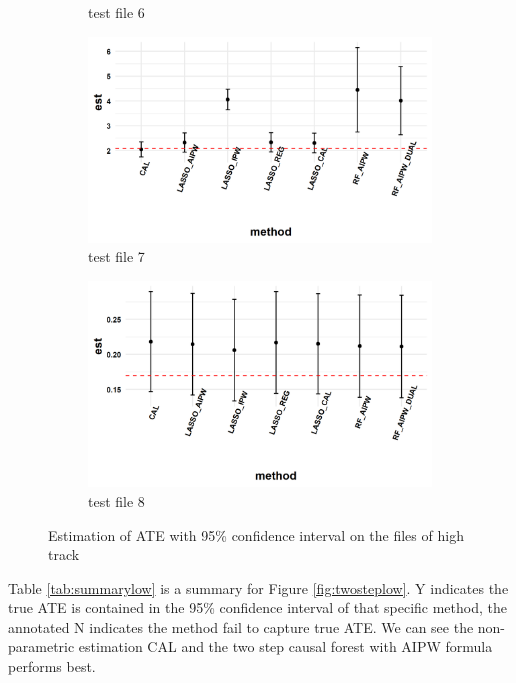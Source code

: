 \documentclass[11pt, oneside]{article}
\begin{document}
\begin{figure}[h]
\begin{subfigure}{0.24\textwidth}
    \caption{test file 6}
  \end{subfigure}
  \begin{subfigure}{0.24\textwidth}
    \includegraphics[width=\textwidth]{../plot/method_comparison_high_7.png}
    \caption{test file 7}
  \end{subfigure}
  \begin{subfigure}{0.24\textwidth}
    \includegraphics[width=\textwidth]{../plot/method_comparison_high_8.png}
    \caption{test file 8}
  \end{subfigure}
 \caption{Estimation of ATE with 95\% confidence interval on the files of high track} 
\label{fig:twostephigh}
\end{figure}
Table \ref{tab:summarylow} is a summary for Figure \ref{fig:twosteplow}. Y indicates the true ATE is contained in the 95\% confidence interval of that specific method, the annotated N indicates the method fail to capture true ATE. We can see the non-parametric estimation CAL and the two step causal forest with AIPW formula performs best.  
\end{document}
